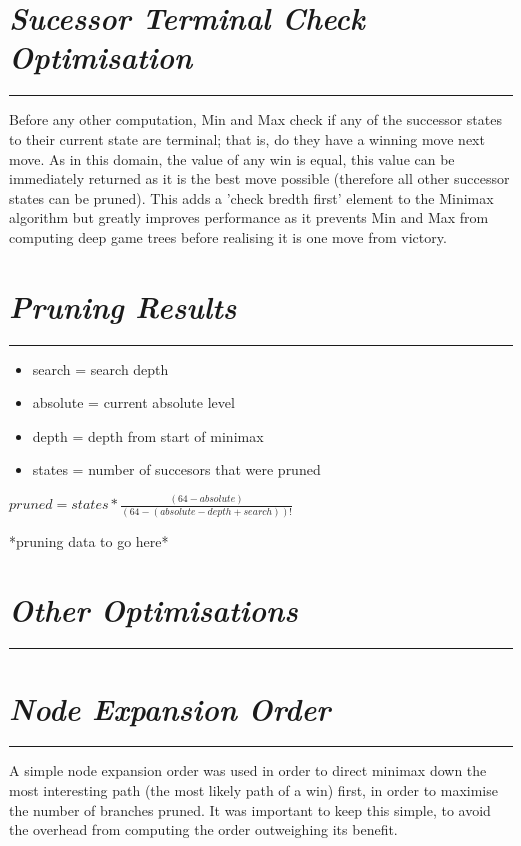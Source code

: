 \documentclass[10pt]{report}
\begin{document}
\begin{multicols}{2}
\section*{\emph{\textmd{Sucessor Terminal Check Optimisation}}}
\hrule
\vspace{0.4cm}

Before any other computation, Min and Max check if any of the successor states to their current state are terminal; that is, do they have a winning move next move. As in this domain, the value of any win is equal, this value can be immediately returned as it is the best move possible (therefore all other successor states can be pruned). This adds a 'check bredth first' element to the Minimax algorithm but greatly improves performance as it prevents Min and Max from computing deep game trees before realising it is one move from victory.

\section*{\emph{\textmd{Pruning Results}}}
\hrule
\vspace{0.4cm}

\begin{itemize}
\item search = search depth
\item absolute = current absolute level
\item depth = depth from start of minimax
\item states = number of succesors that were pruned
\end{itemize}

$pruned = states * \frac{(64 - absolute)}{(64 - (absolute - depth + search))!}$

*pruning data to go here*

\section*{\emph{{Other Optimisations}}}
\hrule
\vspace{0.4cm}

\section*{\emph{\textmd{Node Expansion Order}}}
\hrule
\vspace{0.4cm}

A simple node expansion order was used in order to direct minimax down the most interesting path (the most likely path of a win) first, in order to maximise the number of branches pruned. It was important to keep this simple, to avoid the overhead from computing the order outweighing its benefit.


\end{multicols}
\end{document}
